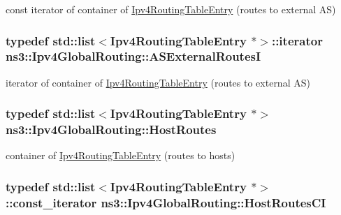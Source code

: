 const iterator of container of \hyperlink{classns3_1_1Ipv4RoutingTableEntry}{Ipv4\+Routing\+Table\+Entry} (routes to external AS) 

\subsubsection[{\texorpdfstring{A\+S\+External\+RoutesI}{ASExternalRoutesI}}]{\setlength{\rightskip}{0pt plus 5cm}typedef {\bf std\+::list}$<${\bf Ipv4\+Routing\+Table\+Entry} $\ast$$>$\+::iterator {\bf ns3\+::\+Ipv4\+Global\+Routing\+::\+A\+S\+External\+RoutesI}\hspace{0.3cm}{\ttfamily [private]}}\hypertarget{classns3_1_1Ipv4GlobalRouting_a2f2e1f2c8d631cfd016343f993cf577b}{}\label{classns3_1_1Ipv4GlobalRouting_a2f2e1f2c8d631cfd016343f993cf577b}


iterator of container of \hyperlink{classns3_1_1Ipv4RoutingTableEntry}{Ipv4\+Routing\+Table\+Entry} (routes to external AS) 

\subsubsection[{\texorpdfstring{Host\+Routes}{HostRoutes}}]{\setlength{\rightskip}{0pt plus 5cm}typedef {\bf std\+::list}$<${\bf Ipv4\+Routing\+Table\+Entry} $\ast$$>$ {\bf ns3\+::\+Ipv4\+Global\+Routing\+::\+Host\+Routes}\hspace{0.3cm}{\ttfamily [private]}}\hypertarget{classns3_1_1Ipv4GlobalRouting_a08b1b12aa1fb8d95b67cefc785f0a235}{}\label{classns3_1_1Ipv4GlobalRouting_a08b1b12aa1fb8d95b67cefc785f0a235}


container of \hyperlink{classns3_1_1Ipv4RoutingTableEntry}{Ipv4\+Routing\+Table\+Entry} (routes to hosts) 

\subsubsection[{\texorpdfstring{Host\+Routes\+CI}{HostRoutesCI}}]{\setlength{\rightskip}{0pt plus 5cm}typedef {\bf std\+::list}$<${\bf Ipv4\+Routing\+Table\+Entry} $\ast$$>$\+::const\+\_\+iterator {\bf ns3\+::\+Ipv4\+Global\+Routing\+::\+Host\+Routes\+CI}\hspace{0.3cm}{\ttfamily [private]}}\hypertarget{classns3_1_1Ipv4GlobalRouting_aae0bc92477a22c30a84d24b7059feba3}{}\label{classns3_1_1Ipv4GlobalRouting_aae0bc92477a22c30a84d24b7059feba3}


